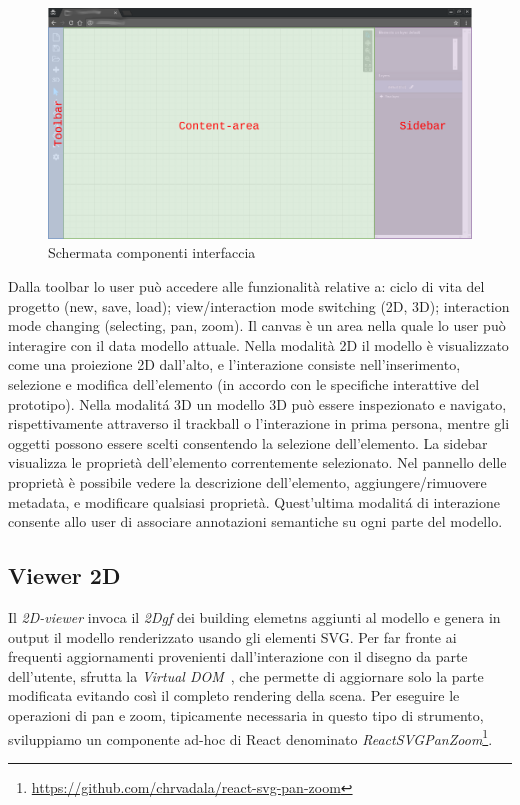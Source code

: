 \begin{figure}[htbp] %
   \centering
   \includegraphics[width=1\linewidth]{images/mock-interfaccia}
   \caption{Schermata componenti interfaccia}
   \label{fig:interfaccia}
\end{figure}
\newpage
Dalla toolbar lo user pu\`o accedere alle funzionalit\`a relative a: ciclo di vita del progetto (new, save, load);
view/interaction mode switching (2D, 3D); interaction mode changing (selecting, pan, zoom).
Il canvas \`e un area nella quale lo user pu\`o interagire con il data modello attuale. Nella modalit\`a 2D
il modello \`e visualizzato come una proiezione 2D dall'alto, e l'interazione consiste nell'inserimento, selezione e modifica
dell'elemento (in accordo con le specifiche interattive del prototipo). Nella modalit\'a 3D un modello 3D pu\`o essere
inspezionato e navigato, rispettivamente attraverso il trackball o l'interazione in prima persona, mentre gli oggetti
possono essere scelti consentendo la selezione dell'elemento.
La sidebar visualizza le propriet\`a dell'elemento correntemente selezionato. Nel pannello delle propriet\`a \`e possibile
vedere la descrizione dell'elemento, aggiungere/rimuovere metadata, e modificare qualsiasi propriet\`a.
Quest'ultima modalit\'a di interazione consente allo user di associare annotazioni semantiche su ogni parte del modello.
\newpage

\subsection{Viewer 2D}
Il \emph{2D-viewer} invoca il \emph{2Dgf} dei building elemetns aggiunti al modello e genera in output il modello
renderizzato usando gli elementi SVG.
Per far fronte ai frequenti aggiornamenti provenienti dall'interazione con il disegno da parte dell'utente,
sfrutta la \emph{Virtual DOM}~\cite{vdom}, che permette di aggiornare solo la parte modificata evitando così
il completo rendering della scena. Per eseguire le operazioni di pan e zoom, tipicamente necessaria in questo
tipo di strumento, sviluppiamo un componente ad-hoc
di React denominato \emph{ReactSVGPanZoom}\footnote{\url{https://github.com/chrvadala/react-svg-pan-zoom}}.\\

